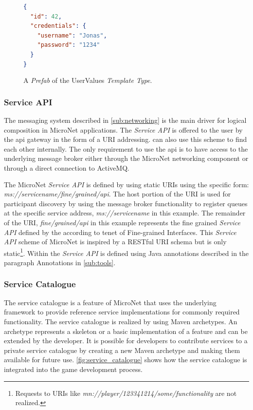 \begin{figure}
\begin{lstlisting}[language=json,firstnumber=1] 
{
  "id": 42,
  "credentials": {
    "username": "Jonas",
    "password": "1234"
  }
}
\end{lstlisting}
\caption{A \textit{Prefab} of the UserValues \textit{Template Type}.}
\label{lst:prefab_type}
\end{figure}



\subsubsection{Service API}

The messaging system described in \autoref{sub:networking} is the main driver
for logical composition in MicroNet applications. The \textit{Service API} is
offered to the user by the \gls{api} gateway in the form of a URI addressing. \mss{}
can also use this scheme to find each other internally. The only requirement to
use the \gls{api} is to have access to the underlying message broker either
through the MicroNet networking component or through a direct connection to
ActiveMQ.

The MicroNet \textit{Service API} is defined by using static URIs using the
specific form: \textit{ms://servicename/fine/grained/api}. The host portion of
the URI is used for participant discovery by using the message broker
functionality to register queues at the specific service address,
\textit{ms://servicename} in this example. The remainder of the URI,
\textit{fine/grained/api} in this example represents the fine grained
\textit{Service API} defined by the \ms{} according to tenet of Fine-grained
Interfaces. This \textit{Service API} scheme of MicroNet is inspired by a
RESTful URI schema but is only static\footnote{Requests to URIs like
\textit{mn://player/123341214/some/functionality} are not realized.}. Within
\mss{} the \textit{Service API} is defined using Java annotations described in
the paragraph Annotations in \autoref{sub:tools}.

\subsubsection{Service Catalogue}

The service catalogue is a feature of MicroNet that uses the underlying
framework to provide reference service implementations for commonly required
functionality. The service catalogue is realized by using Maven archetypes. An
archetype represents a skeleton or a basic implementation of a feature and can
be extended by the developer. It is possible for developers to contribute
services to a private service catalogue by creating a new Maven archetype and
making them available for future use. \autoref{fig:service_catalogue} shows
how the service catalogue is integrated into the game development process.

